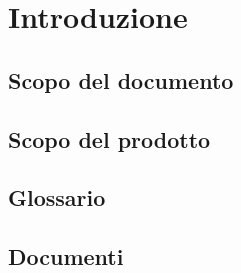 \section{Introduzione}

\subsection{Scopo del documento}

\subsection{Scopo del prodotto}

\subsection{Glossario}

\subsection{Documenti}
